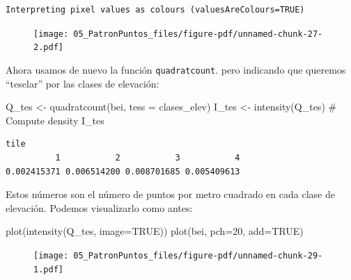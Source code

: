 \documentclass[
  letterpaper,
  DIV=11,
  numbers=noendperiod]{scrreprt}
\newenvironment{Shaded}{\begin{snugshade}}{\end{snugshade}}
\newcommand{\AttributeTok}[1]{\textcolor[rgb]{0.40,0.45,0.13}{#1}}
\newcommand{\CommentTok}[1]{\textcolor[rgb]{0.37,0.37,0.37}{#1}}
\newcommand{\ConstantTok}[1]{\textcolor[rgb]{0.56,0.35,0.01}{#1}}
\newcommand{\DecValTok}[1]{\textcolor[rgb]{0.68,0.00,0.00}{#1}}
\newcommand{\FunctionTok}[1]{\textcolor[rgb]{0.28,0.35,0.67}{#1}}
\newcommand{\NormalTok}[1]{\textcolor[rgb]{0.00,0.23,0.31}{#1}}
\newcommand{\OtherTok}[1]{\textcolor[rgb]{0.00,0.23,0.31}{#1}}
\begin{document}
\begin{verbatim}
Interpreting pixel values as colours (valuesAreColours=TRUE)
\end{verbatim}

\begin{figure}[H]

{\centering \texttt{[image: 05\_PatronPuntos\_files/figure-pdf/unnamed-chunk-27-2.pdf]}

}

\end{figure}

Ahora usamos de nuevo la función \texttt{quadratcount}. pero indicando
que queremos ``teselar'' por las clases de elevación:

\begin{Shaded}
\begin{Highlighting}[]
\NormalTok{Q\_tes   }\OtherTok{\textless{}{-}} \FunctionTok{quadratcount}\NormalTok{(bei, }\AttributeTok{tess =}\NormalTok{ clases\_elev)  }
\NormalTok{I\_tes }\OtherTok{\textless{}{-}} \FunctionTok{intensity}\NormalTok{(Q\_tes)  }\CommentTok{\# Compute density}
\NormalTok{I\_tes}
\end{Highlighting}
\end{Shaded}

\begin{verbatim}
tile
          1           2           3           4 
0.002415371 0.006514200 0.008701685 0.005409613 
\end{verbatim}

Estos números son el número de puntos por metro cuadrado en cada clase
de elevación. Podemos visualizarlo como antes:

\begin{Shaded}
\begin{Highlighting}[]
\FunctionTok{plot}\NormalTok{(}\FunctionTok{intensity}\NormalTok{(Q\_tes, }\AttributeTok{image=}\ConstantTok{TRUE}\NormalTok{))}
\FunctionTok{plot}\NormalTok{(bei, }\AttributeTok{pch=}\DecValTok{20}\NormalTok{, }\AttributeTok{add=}\ConstantTok{TRUE}\NormalTok{)}
\end{Highlighting}
\end{Shaded}

\begin{figure}[H]

{\centering \texttt{[image: 05\_PatronPuntos\_files/figure-pdf/unnamed-chunk-29-1.pdf]}

}

\end{figure}
\end{document}
